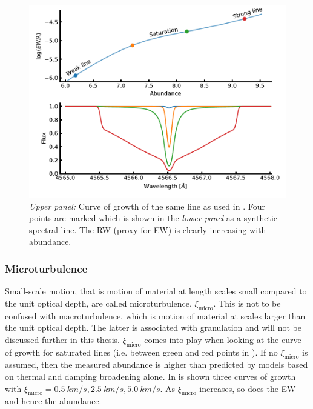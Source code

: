 {\begin{figure}[htpb!]
    \centering
    \includegraphics[width=0.85\linewidth]{figures/cog.pdf}
    \caption{\emph{Upper panel:} Curve of growth of the same  line as used in
                                 . Four points are marked which is shown in the
             \emph{lower panel} as a synthetic spectral line. The RW (proxy for EW) is clearly
                                increasing with abundance.}
    \label{fig:cog}
\end{figure}


\subsubsection{Microturbulence}

Small-scale motion, that is motion of material at length scales small compared to the unit optical
depth, are called microturbulence, $\xi_\mathrm{micro}$. This is not to be confused with
macroturbulence, which is motion of material at scales larger than the unit optical depth. The
latter is associated with granulation and will not be discussed further in this thesis.
$\xi_\mathrm{micro}$ comes into play when looking at the curve of growth for saturated lines (i.e.
between green and red points in ). If no $\xi_\mathrm{micro}$ is assumed, then the
measured abundance is higher than predicted by models based on thermal and damping broadening alone.
In  is shown three curves of growth with $\xi_\mathrm{micro}={\SI{0.5}{km/s},
\SI{2.5}{km/s}, \SI{5.0}{km/s}}$. As $\xi_\mathrm{micro}$ increases, so does the EW and hence the
abundance.

}
